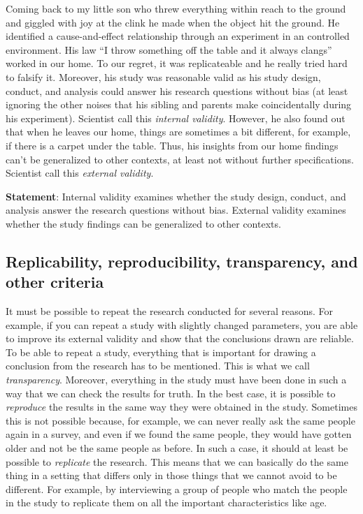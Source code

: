 \documentclass[
  12pt,
  oneside]{book}
\theoremstyle{definition}
\theoremstyle{definition}
\theoremstyle{definition}
\theoremstyle{definition}
\theoremstyle{remark}
\begin{document}
Coming back to my little son who threw everything within reach to the ground and giggled with joy at the clink he made when the object hit the ground. He identified a cause-and-effect relationship through an experiment in an controlled environment. His law ``I throw something off the table and it always clangs'' worked in our home. To our regret, it was replicateable and he really tried hard to falsify it. Moreover, his study was reasonable valid as his study design, conduct, and analysis could answer his research questions without bias (at least ignoring the other noises that his sibling and parents make coincidentally during his experiment). Scientist call this \emph{internal validity}.
However, he also found out that when he leaves our home, things are sometimes a bit different, for example, if there is a carpet under the table. Thus, his insights from our home findings can't be generalized to other contexts, at least not without further specifications. Scientist call this \emph{external validity}.

\textbf{Statement}: Internal validity examines whether the study design, conduct, and analysis answer the research questions without bias. External validity examines whether the study findings can be generalized to other contexts.

\hypertarget{replicability-reproducibility-transparency-and-other-criteria}{%
\subsection{Replicability, reproducibility, transparency, and other criteria}\label{replicability-reproducibility-transparency-and-other-criteria}}

It must be possible to repeat the research conducted for several reasons. For example, if you can repeat a study with slightly changed parameters, you are able to improve its external validity and show that the conclusions drawn are reliable. To be able to repeat a study, everything that is important for drawing a conclusion from the research has to be mentioned. This is what we call \emph{transparency}. Moreover, everything in the study must have been done in such a way that we can check the results for truth. In the best case, it is possible to \emph{reproduce} the results in the same way they were obtained in the study. Sometimes this is not possible because, for example, we can never really ask the same people again in a survey, and even if we found the same people, they would have gotten older and not be the same people as before. In such a case, it should at least be possible to \emph{replicate} the research. This means that we can basically do the same thing in a setting that differs only in those things that we cannot avoid to be different. For example, by interviewing a group of people who match the people in the study to replicate them on all the important characteristics like age.
\end{document}

